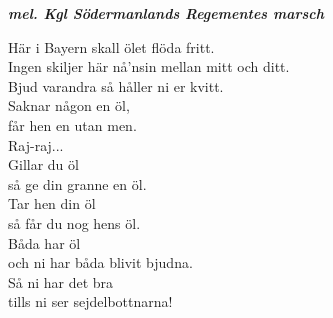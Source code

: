 \documentclass[a6paper,10pt]{article}
\newcommand{\mel}[1]{\small\textbf{\textit{mel. #1 \\}}}
\begin{document}
\noindent
{}
\begin{center}
    \mel{Kgl Södermanlands Regementes marsch}
\end{center}
\begin{lyrics}
\small Här i Bayern skall ölet flöda fritt. \\
Ingen skiljer här nå'nsin mellan mitt och ditt. \\
Bjud varandra så håller ni er kvitt. \\
Saknar någon en öl, \\
får hen en utan men. \\
\newline
Raj-raj... \\
\newline
Gillar du öl \\
så ge din granne en öl. \\
Tar hen din öl \\
så får du nog hens öl. \\
Båda har öl \\
och ni har båda blivit bjudna. \\
Så ni har det bra \\
tills ni ser sejdelbottnarna! 
\end{lyrics}
\end{document}
